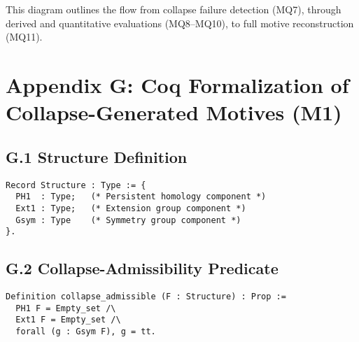 \documentclass[11pt]{article}
\begin{document}
\vspace{1em}
\begin{center}
\end{center}
\vspace{1em}

This diagram outlines the flow from collapse failure detection (MQ7), through derived and quantitative evaluations (MQ8–MQ10), to full motive reconstruction (MQ11).

\FloatBarrier




\section*{Appendix G: Coq Formalization of Collapse-Generated Motives (M1)}

\subsection*{G.1 Structure Definition}

\begin{lstlisting}[language=Coq]
Record Structure : Type := {
  PH1  : Type;   (* Persistent homology component *)
  Ext1 : Type;   (* Extension group component *)
  Gsym : Type    (* Symmetry group component *)
}.
\end{lstlisting}

\subsection*{G.2 Collapse-Admissibility Predicate}

\begin{lstlisting}[language=Coq]
Definition collapse_admissible (F : Structure) : Prop :=
  PH1 F = Empty_set /\
  Ext1 F = Empty_set /\
  forall (g : Gsym F), g = tt.
\end{lstlisting}
\end{document}
